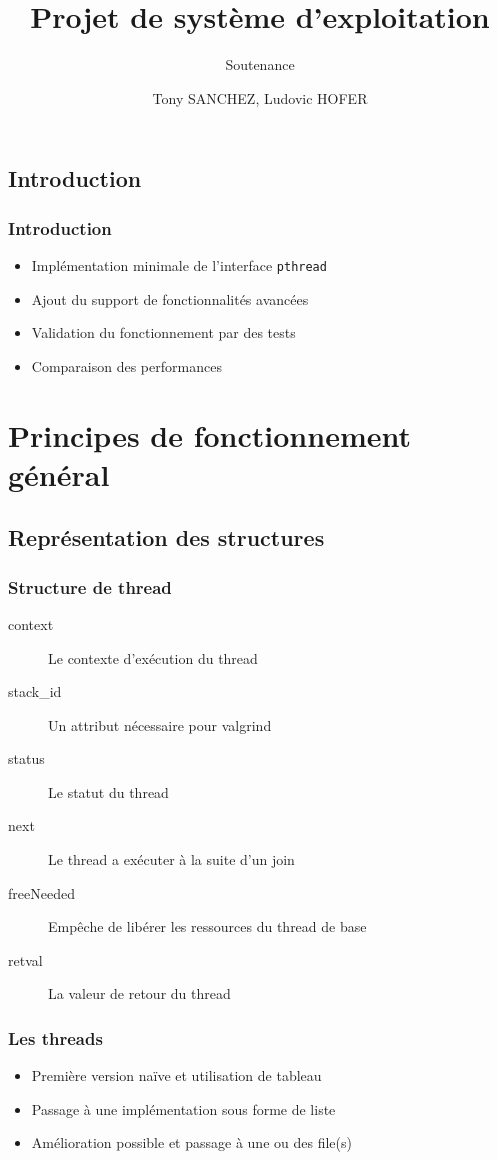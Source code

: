 \documentclass{beamer}
\title{Projet de système d'exploitation}
\subtitle{Soutenance}
\author{Tony SANCHEZ, Ludovic HOFER}
\institute{ENSERIB-MATMECA}
\begin{document}
 
\maketitle

\tableofcontents
 
\begin{frame}
\section{Introduction}
\frametitle{Introduction}

\begin{itemize}
\item Implémentation minimale de l'interface \verb!pthread!
\item Ajout du support de fonctionnalités avancées
\item Validation du fonctionnement par des tests
\item Comparaison des performances
\end{itemize}
 
\end{frame}

\section{Principes de fonctionnement général}
\subsection{Représentation des structures}

\begin{frame}
\frametitle{Structure de thread}
 
\begin{description}
	\item[context] Le contexte d'exécution du thread
	\item[stack\_id] Un attribut nécessaire pour valgrind
	\item[status] Le statut du thread
	\item[next] Le thread a exécuter à la suite d'un join
	\item[freeNeeded] Empêche de libérer les ressources du thread de base
	\item[retval] La valeur de retour du thread
\end{description}
 
\end{frame}

\begin{frame}
\frametitle{Les threads}

\begin{itemize}
\item Première version naïve et utilisation de tableau
\item Passage à une implémentation sous forme de liste
\item Amélioration possible et passage à une ou des file(s)
	
\end{itemize}
 
\end{frame}
\end{document}
